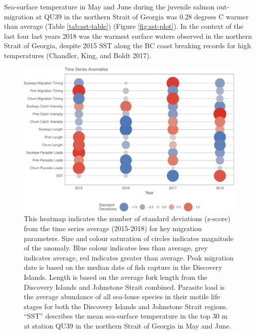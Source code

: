 \documentclass[fleqn,10pt]{wlpeerj} %
\begin{document}
Sea-surface temperature in May and June during the juvenile salmon
out-migration at QU39 in the northern Strait of Georgia was 0.28 degrees
C warmer than average (Table \ref{tab:sst-table}) (Figure
\ref{fig:sst-plot}). In the context of the last four last years 2018 was
the warmest surface waters observed in the northern Strait of Georgia,
despite 2015 SST along the BC coast breaking records for high
temperatures (Chandler, King, and Boldt 2017).

\begin{figure}[H]
\includegraphics[width=0.95\linewidth]{Migration_Observations_Report_files/figure-latex/heatmap-1} \caption{This heatmap indicates the number of standard deviations (z-score) from the time series average (2015-2018) for key migration parameters. Size and colour saturation of circles indicates magnitude of the anomaly. Blue colour indicates less than average, grey indicates average, red indicates greater than average. Peak migration date is based on the median date of fish capture in the Discovery Islands. Length is based on the average fork length from the Discovery Islands and Johnstone Strait combined. Parasite load is the average abundance of all sea-louse species in their motile life stages for both the Discovery Islands and Johnstone Strait regions. “SST” describes the mean sea-surface temperature in the top 30 m at station QU39 in the northern Strait of Georgia in May and June.}\label{fig:heatmap}
\end{figure}
\end{document}
